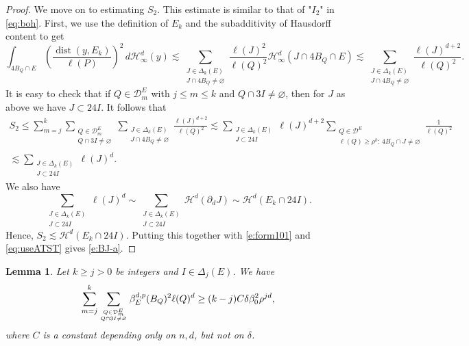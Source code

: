 \documentclass[11pt,reqno]{amsart}
\def\dist{\mathop\mathrm{dist}} 						%
\newtheorem{lemma}[theorem]{Lemma}
\theoremstyle{definition}
\theoremstyle{remark}
\numberwithin{equation}{section}
\newcommand{\hdc}{\mathcal{H}^d_\infty}
\newcommand{\dD}{\mathcal{D}}
\newcommand{\dH}{\mathcal{H}}
\theoremstyle{theorem}
\theoremstyle{definition}
\theoremstyle{remark}
\numberwithin{equation}{section}
\begin{document}
\begin{proof}
		We move on to estimating $S_2$. This estimate is similar to that of "$I_2$" in \eqref{eq:boh}. First, we use the definition of $E_k$ and the subadditivity of Hausdorff content to get
		\begin{equation*}
			\int_{4B_Q\cap E} \left(\frac{\dist(y, E_k)}{\ell(P)} \right)^2 \, d \hdc(y) \lesssim \sum_{\substack{J \in \Delta_k(E) \\ J \cap 4B_Q \neq \varnothing}} \frac{\ell(J)^{2}}{\ell(Q)^2} \hdc(J \cap 4B_Q \cap E) \lesssim\sum_{\substack{J \in \Delta_k(E) \\ J \cap 4B_Q \neq \varnothing}} \frac{\ell(J)^{d+2}}{\ell(Q)^2}.
		\end{equation*} 
		It is easy to check that if $Q\in\dD^E_m$ with $j\le m\le k$ and $Q\cap 3I\neq\varnothing$, then for $J$ as above we have $J\subset 24I$. It follows that
		\begin{multline*}
			S_2\le \sum_{m=j}^{k} \sum_{\substack{Q \in \dD^E_m \\ Q \cap 3I \neq \varnothing}} \sum_{\substack{J \in \Delta_k(E) \\ J \cap 4B_Q \neq \varnothing}} \frac{\ell(J)^{d+2} }{\ell(Q)^2}  \lesssim \sum_{\substack{J \in \Delta_k(E) \\ J \subset 24I}} \ell(J)^{d+2} \sum_{\substack{Q \in \dD^{E} \\ \ell(Q)\ge \rho^{k}: \,  4B_Q \cap J \neq \varnothing}} \frac{1}{\ell(Q)^2} \\
			 \lesssim \sum_{\substack{J \in \Delta_k(E)  \\ J \subset 24I}} \ell(J)^{d}.
		\end{multline*}
		We also have
		\begin{equation*}
		\sum_{\substack{J \in \Delta_k(E) \\ J \subset 24I}} \ell(J)^d\sim \sum_{\substack{J \in \Delta_k (E)\\ J \subset 24I}} \mathcal{H}^d(\partial_d J) \sim \dH^d(E_k \cap 24I).
		\end{equation*}
		Hence, $S_2\lesssim \dH^d(E_k \cap 24I)$. Putting this together with \eqref{e:form101} and \eqref{eq:useATST} gives \eqref{e:BJ-a}.
		
%
%
%
%
%
		
%
%
%
%
%
%
%
%
	\end{proof}
	
	\begin{lemma}
		Let $k\ge j >0$ be integers and $I\in\Delta_j(E)$. We have
		\begin{equation}\label{e:form102}
		\sum_{m=j}^k \sum_{Q \in \dD^E_m \atop Q \cap 3I \neq \varnothing} \beta_{E}^{d,p}(B_Q)^2 \ell(Q)^d  \geq (k-j) C \delta  \beta_0^2 \rho^{jd},
		\end{equation}
		where $C$ is a constant depending only on $n, d$, but not on $\delta$.
	\end{lemma}
	
\end{document}
